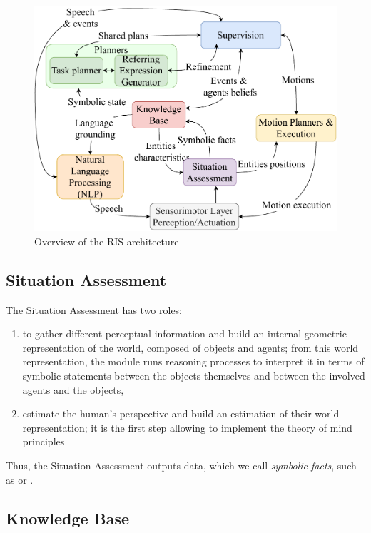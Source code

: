 \documentclass[a4paper,11pt,twoside]{StyleThese}
\begin{document}
\begin{figure}[!ht]
	\includegraphics[width=\linewidth]{figures/chapter2/archi_overview.pdf}
	\caption{Overview of the RIS architecture}
	\label{chap2:fig:archi}
\end{figure}


\subsection{Situation Assessment}
The Situation Assessment has two roles:
\begin{enumerate}
	\item  to gather different perceptual information and build an internal geometric representation of the world, composed of objects and agents; from this world representation, the module runs reasoning processes to interpret it in terms of symbolic statements between the objects themselves and between the involved agents and the objects,
	\item estimate the human's perspective and build an estimation of their world representation; it is the first step allowing to implement the theory of mind principles \cite{baron_1985_does}
\end{enumerate}

Thus, the Situation Assessment outputs data, which we call \textit{symbolic facts}, such as  or .

\subsection{Knowledge Base}
\end{document}
